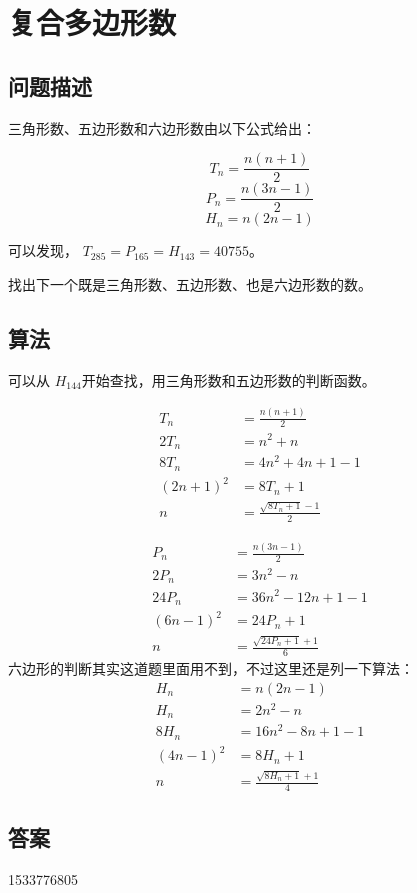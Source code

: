 \section{复合多边形数}\label{sec:problem45}
\subsection{问题描述}
\begin{tcolorbox}
	三角形数、五边形数和六边形数由以下公式给出：

	\[
		T_n = \frac{n(n + 1)}{2}
	\]
	\[
		P_n = \frac{n(3n - 1)}{2}
	\]
	\[
		H_n = n(2n - 1)
	\]

	可以发现， $ T_{285} = P_{165} = H_{143} =40755 $。

	找出下一个既是三角形数、五边形数、也是六边形数的数。

\end{tcolorbox}

\subsection{算法}
可以从 $ H_{144}$开始查找，用三角形数和五边形数的判断函数。

\begin{align*}
	T_n        & = \frac{n(n+1)}{2}                      \\
	2T_n       & = n^2 + n                               \\
	8T_n       & = 4n^2 + 4n + 1 - 1                     \\
	(2n + 1)^2 & = 8T_n + 1                              \\
	n          & = \frac{\sqrt{8T_n + 1} - 1}{2} \tag{1}
\end{align*}

\begin{align*}
	P_n        & = \frac{n(3n - 1)}{2}                    \\
	2P_n       & = 3n^2 - n                               \\
	24P_n      & = 36n^2 - 12n + 1 - 1                    \\
	(6n - 1)^2 & = 24P_n + 1                              \\
	n          & = \frac{\sqrt{24P_n + 1} + 1}{6} \tag{2}
\end{align*}
六边形的判断其实这道题里面用不到，不过这里还是列一下算法：
\begin{align*}
	H_n        & = n(2n - 1)                             \\
	H_n        & = 2n^2 - n                              \\
	8H_n       & = 16n^2 - 8n + 1 - 1                    \\
	(4n - 1)^2 & = 8H_n + 1                              \\
	n          & = \frac{\sqrt{8H_n + 1} + 1}{4} \tag{3}
\end{align*}
\subsection{答案}
1533776805
